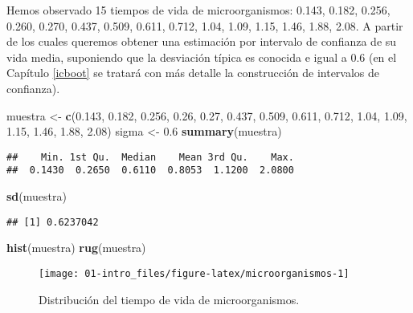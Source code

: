 \documentclass[]{book}
\newenvironment{Shaded}{\begin{snugshade}}{\end{snugshade}}
\newcommand{\KeywordTok}[1]{\textcolor[rgb]{0.13,0.29,0.53}{\textbf{#1}}}
\newcommand{\FloatTok}[1]{\textcolor[rgb]{0.00,0.00,0.81}{#1}}
\newcommand{\StringTok}[1]{\textcolor[rgb]{0.31,0.60,0.02}{#1}}
\newcommand{\NormalTok}[1]{#1}
\theoremstyle{break}
\theoremstyle{definition}
\theoremstyle{definition}
\theoremstyle{definition}
\theoremstyle{remark}
\begin{document}
Hemos observado 15 tiempos de vida de microorganismos: 0.143, 0.182,
0.256, 0.260, 0.270, 0.437, 0.509, 0.611, 0.712, 1.04, 1.09, 1.15, 1.46,
1.88, 2.08. A partir de los cuales queremos obtener una estimación por
intervalo de confianza de su vida media, suponiendo que la desviación
típica es conocida e igual a 0.6 (en el Capítulo \ref{icboot} se tratará
con más detalle la construcción de intervalos de confianza).

\begin{Shaded}
\begin{Highlighting}[]
\NormalTok{muestra <-}\StringTok{ }\KeywordTok{c}\NormalTok{(}\FloatTok{0.143}\NormalTok{, }\FloatTok{0.182}\NormalTok{, }\FloatTok{0.256}\NormalTok{, }\FloatTok{0.26}\NormalTok{, }\FloatTok{0.27}\NormalTok{, }\FloatTok{0.437}\NormalTok{, }\FloatTok{0.509}\NormalTok{, }
    \FloatTok{0.611}\NormalTok{, }\FloatTok{0.712}\NormalTok{, }\FloatTok{1.04}\NormalTok{, }\FloatTok{1.09}\NormalTok{, }\FloatTok{1.15}\NormalTok{, }\FloatTok{1.46}\NormalTok{, }\FloatTok{1.88}\NormalTok{, }\FloatTok{2.08}\NormalTok{)}
\NormalTok{sigma <-}\StringTok{ }\FloatTok{0.6}
\KeywordTok{summary}\NormalTok{(muestra)}
\end{Highlighting}
\end{Shaded}

\begin{verbatim}
##    Min. 1st Qu.  Median    Mean 3rd Qu.    Max. 
##  0.1430  0.2650  0.6110  0.8053  1.1200  2.0800
\end{verbatim}

\begin{Shaded}
\begin{Highlighting}[]
\KeywordTok{sd}\NormalTok{(muestra)}
\end{Highlighting}
\end{Shaded}

\begin{verbatim}
## [1] 0.6237042
\end{verbatim}

\begin{Shaded}
\begin{Highlighting}[]
\KeywordTok{hist}\NormalTok{(muestra)}
\KeywordTok{rug}\NormalTok{(muestra)}
\end{Highlighting}
\end{Shaded}

\begin{figure}[!htb]

{\centering \texttt{[image: 01-intro\_files/figure-latex/microorganismos-1]} 

}

\caption{Distribución del tiempo de vida de microorganismos.}\label{fig:microorganismos}
\end{figure}
\end{document}

